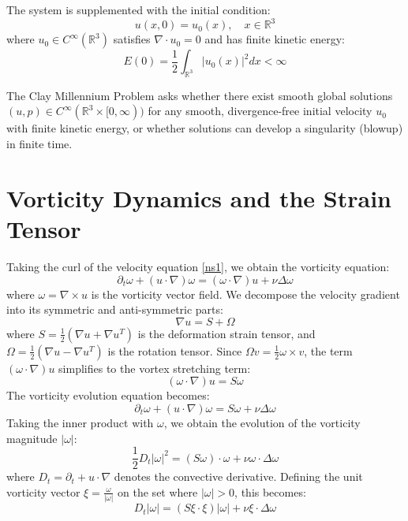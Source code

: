 \documentclass[11pt,a4paper]{article}
\theoremstyle{definition}
\begin{document}
The system is supplemented with the initial condition:
\begin{equation}
u(x, 0) = u_0(x), \quad x \in \mathbb{R}^3
\end{equation}
where $u_0 \in C^\infty(\mathbb{R}^3)$ satisfies $\nabla \cdot u_0 = 0$ and has finite kinetic energy:
\begin{equation}
E(0) = \frac{1}{2} \int_{\mathbb{R}^3} |u_0(x)|^2 dx < \infty
\end{equation}

The Clay Millennium Problem asks whether there exist smooth global solutions $(u, p) \in C^\infty(\mathbb{R}^3 \times [0, \infty))$ for any smooth, divergence-free initial velocity $u_0$ with finite kinetic energy, or whether solutions can develop a singularity (blowup) in finite time.

\section{Vorticity Dynamics and the Strain Tensor}
Taking the curl of the velocity equation \eqref{ns1}, we obtain the vorticity equation:
\begin{equation}
\partial_t \omega + (u \cdot \nabla) \omega = (\omega \cdot \nabla) u + \nu \Delta \omega \label{vort_eq}
\end{equation}
where $\omega = \nabla \times u$ is the vorticity vector field.
We decompose the velocity gradient into its symmetric and anti-symmetric parts:
\begin{equation}
\nabla u = S + \Omega
\end{equation}
where $S = \frac{1}{2}(\nabla u + \nabla u^T)$ is the deformation strain tensor, and $\Omega = \frac{1}{2}(\nabla u - \nabla u^T)$ is the rotation tensor.
Since $\Omega v = \frac{1}{2} \omega \times v$, the term $(\omega \cdot \nabla) u$ simplifies to the vortex stretching term:
\begin{equation}
(\omega \cdot \nabla) u = S \omega
\end{equation}
The vorticity evolution equation becomes:
\begin{equation}
\partial_t \omega + (u \cdot \nabla) \omega = S \omega + \nu \Delta \omega
\end{equation}
Taking the inner product with $\omega$, we obtain the evolution of the vorticity magnitude $|\omega|$:
\begin{equation}
\frac{1}{2} D_t |\omega|^2 = (S \omega) \cdot \omega + \nu \omega \cdot \Delta \omega
\end{equation}
where $D_t = \partial_t + u \cdot \nabla$ denotes the convective derivative.
Defining the unit vorticity vector $\xi = \frac{\omega}{|\omega|}$ on the set where $|\omega| > 0$, this becomes:
\begin{equation}
D_t |\omega| = (S \xi \cdot \xi) |\omega| + \nu \xi \cdot \Delta \omega \label{mag_eq}
\end{equation}
\end{document}
